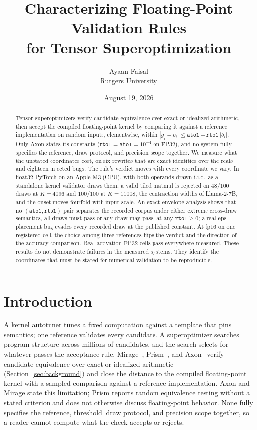 \documentclass[twocolumn,10pt]{article}
\title{Characterizing Floating-Point Validation Rules\\for Tensor Superoptimization}
\author{Ayaan Faisal\\Rutgers University}
\date{August 19, 2026}
\newcommand{\atol}{\texttt{atol}}
\newcommand{\rtol}{\texttt{rtol}}
\begin{document}
\maketitle

\begin{abstract}
Tensor superoptimizers verify candidate equivalence over exact or
idealized arithmetic, then accept the compiled floating-point kernel by
comparing it against a reference implementation on random inputs,
elementwise, within $|g_i-b_i|\le\atol+\rtol\,|b_i|$. Only Axon states
its constants ($\rtol=\atol=10^{-4}$ on FP32), and no system fully
specifies the reference, draw protocol, and precision scope together. We
measure what the unstated coordinates cost, on six rewrites that are
exact identities over the reals and eighteen injected bugs. The rule's
verdict moves with every coordinate we vary. In float32 PyTorch on an
Apple M3 (CPU), with both operands drawn i.i.d.\ as a standalone kernel
validator draws them, a valid tiled matmul is rejected on $48/100$ draws
at $K{=}4096$ and $100/100$ at $K{=}11008$, the contraction widths of
Llama-2-7B, and the onset moves fourfold with input scale. An exact
envelope analysis shows that no $(\atol,\rtol)$ pair separates the
recorded corpus under either extreme cross-draw semantics,
all-draws-must-pass or any-draw-may-pass, at any $\rtol\ge0$; a real
eps-placement bug evades every recorded draw at the published constant.
At fp16 on one registered cell, the choice among three references flips
the verdict and the direction of the accuracy comparison.
Real-activation FP32 cells pass everywhere measured. These results do
not demonstrate failures in the measured systems. They identify the
coordinates that must be stated for numerical validation to be
reproducible.
\end{abstract}

\section{Introduction}

A kernel autotuner tunes a fixed computation against a template that pins
semantics; one reference validates every candidate. A superoptimizer
searches program structure across millions of candidates, and the search
selects for whatever passes the acceptance rule. Mirage~\cite{mirage},
Prism~\cite{prism}, and Axon~\cite{axon} verify candidate equivalence over
exact or idealized arithmetic (Section~\ref{sec:background}) and close the
distance to the compiled floating-point kernel with a sampled comparison
against a reference implementation. Axon and Mirage state this
limitation; Prism reports random equivalence testing without a stated
criterion and does not otherwise discuss floating-point behavior. None
fully specifies the reference, threshold, draw protocol, and precision
scope together, so a reader cannot compute what the check accepts or
rejects.
\end{document}
